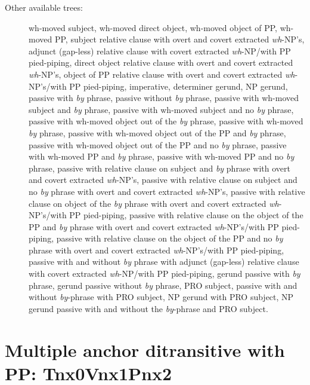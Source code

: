 \begin{description}
\item[Other available trees:] wh-moved subject, wh-moved direct object,
wh-moved object of PP, wh-moved PP, subject relative clause with overt and
covert extracted {\it wh}-NP's, adjunct (gap-less) relative clause with
covert extracted {\it wh}-NP/with PP pied-piping, direct object relative
clause with overt and covert extracted {\it wh}-NP's, object of PP relative
clause with overt and covert extracted {\it wh}-NP's/with PP pied-piping,
imperative, determiner gerund, NP gerund, passive with {\it by} phrase,
passive without {\it by} phrase, passive with wh-moved subject and {\it by}
phrase, passive with wh-moved subject and no {\it by} phrase, passive with
wh-moved object out of the {\it by} phrase, passive with wh-moved {\it by}
phrase, passive with wh-moved object out of the PP and {\it by} phrase,
passive with wh-moved object out of the PP and no {\it by} phrase, passive
with wh-moved PP and {\it by} phrase, passive with wh-moved PP and no {\it
by} phrase, passive with relative clause on subject and {\it by} phrase
with overt and covert extracted {\it wh}-NP's, passive with relative clause
on subject and no {\it by} phrase with overt and covert extracted {\it
wh}-NP's, passive with relative clause on object of the {\it by} phrase
with overt and covert extracted {\it wh}-NP's/with PP pied-piping, passive
with relative clause on the object of the PP and {\it by} phrase with overt
and covert extracted {\it wh}-NP's/with PP pied-piping, passive with
relative clause on the object of the PP and no {\it by} phrase with overt
and covert extracted {\it wh}-NP's/with PP pied-piping, passive with and
without {\it by} phrase with adjunct (gap-less) relative clause with covert
extracted {\it wh}-NP/with PP pied-piping, gerund passive with {\it by}
phrase, gerund passive without {\it by} phrase, PRO subject, passive with
and without {\it by}-phrase with PRO subject, NP gerund with PRO subject,
NP gerund passive with and without the {\it by}-phrase and PRO subject.

\end{description}



\section{Multiple anchor ditransitive with PP:
Tnx0Vnx1Pnx2}
\label{nx0Vnx1Pnx2-family}

